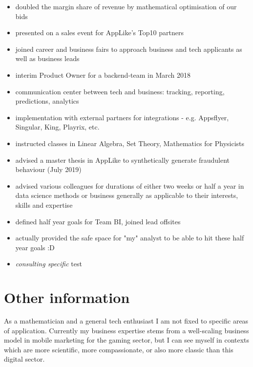 \documentclass[a4paper]{twentysecondcv} %
\begin{document}
\begin{twenty} %
    { 
    \begin{itemize}
    \item doubled the margin share of revenue by mathematical optimisation of our bids    
    \item presented on a sales event for AppLike's Top10 partners 
    \item joined career and business fairs to approach business and tech applicants as well as business leads
    \item interim Product Owner for a backend-team in March 2018    
    \item communication center between tech and business: tracking, reporting, predictions, analytics
    \item implementation with external partners for integrations - e.g. Appsflyer, Singular, King, Playrix, etc.
    \item instructed classes in Linear Algebra, Set Theory, Mathematics for Physicists
    \item advised a master thesis in AppLike to synthetically generate fraudulent
    behaviour (July 2019)
    \item advised various colleagues for durations of either two weeks or half a year 
    in data science methods or business generally as applicable to their interests, skills and expertise
    \item defined half year goals for Team BI, joined lead offsites
    \item actually provided the safe space for "my" analyst to be able to hit these half year goals :D    
    \item {\it consulting specific } test
    \end{itemize}
    }
\end{twenty}


\section{Other information}
As a mathematician and a general tech enthusiast I am not fixed to specific areas of application.
Currently my business expertise stems from a well-scaling business model in mobile marketing for
the gaming sector, but I can see myself in contexts which are more scientific, more compassionate,
or also more classic than this digital sector. 
\end{document}
